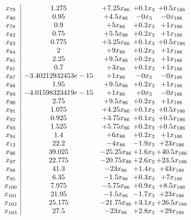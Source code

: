 \documentclass[11pt]{article}
\begin{document}
\[\begin{array}{c| c c@{\hskip 2pt} c@{\hskip 2pt} c@{\hskip 2pt} }
 x_{79}   &  1.275 & + 7.25 x_{86} & + 0.1 x_{3} & + 0.5 x_{186}\\
 x_{80}   &  0.95 & + 4.5 x_{86} & -0 x_{3} & -0 x_{186}\\
 x_{78}   &  0.9 & + 5 x_{86} & + 0.2 x_{3} & + 1 x_{186}\\
 x_{82}   &  0.75 & + 5.5 x_{86} & + 0.2 x_{3} & + 1 x_{186}\\
 x_{83}   &  0.775 & + 3.25 x_{86} & + 0.1 x_{3} & + 0.5 x_{186}\\
 x_{84}   &  2 & + 9 x_{86} & + 0.2 x_{3} & + 1 x_{186}\\
 x_{85}   &  2.25 & + 9.5 x_{86} & + 0.2 x_{3} & + 1 x_{186}\\
 x_{81}   &  0.7 & + 3 x_{86} & + 0.1 x_{3} & + 1 x_{186}\\
 x_{87}   &  -3.40212932453e-15 & + 1 x_{86} & -0 x_{3} & -0 x_{186}\\
 x_{88}   &  1.95 & + 9.5 x_{86} & + 0.2 x_{3} & + 1 x_{186}\\
 x_{89}   &  -4.01598323419e-15 & + 1 x_{86} & + 0 x_{3} & -0 x_{186}\\
 x_{90}   &  2.75 & + 9.5 x_{86} & + 0.2 x_{3} & + 1 x_{186}\\
 x_{91}   &  1.075 & + 4.25 x_{86} & + 0.1 x_{3} & + 0.5 x_{186}\\
 x_{92}   &  0.925 & + 3.75 x_{86} & + 0.1 x_{3} & + 0.5 x_{186}\\
 x_{93}   &  1.525 & + 5.75 x_{86} & + 0.2 x_{3} & + 0.5 x_{186}\\
 x_{94}   &  1.4 & + 6 x_{86} & + 0.2 x_{3} & + 1 x_{186}\\
 x_{12}   &  22.2 & -4 x_{86} & -1.9 x_{3} & + 23 x_{186}\\
 x_{96}   &  39.025 & -25.25 x_{86} & + 1.6 x_{3} & + 40.5 x_{186}\\
 x_{97}   &  22.775 & -20.75 x_{86} & + 2.6 x_{3} & + 23.5 x_{186}\\
 x_{98}   &  41.3 & -23 x_{86} & + 1.4 x_{3} & + 43 x_{186}\\
 x_{95}   &  6.35 & -1.5 x_{86} & + 0.3 x_{3} & + 7 x_{186}\\
 x_{100}   &  7.975 & -5.75 x_{86} & + 0.9 x_{3} & + 8.5 x_{186}\\
 x_{101}   &  21.95 & -1.5 x_{86} & -1.7 x_{3} & + 23 x_{186}\\
 x_{102}   &  25.175 & -21.75 x_{86} & + 3.1 x_{3} & + 26.5 x_{186}\\
 x_{103}   &  27.5 & -23 x_{86} & + 2.8 x_{3} & + 29 x_{186}\\

\end{array}\]
\end{document}

